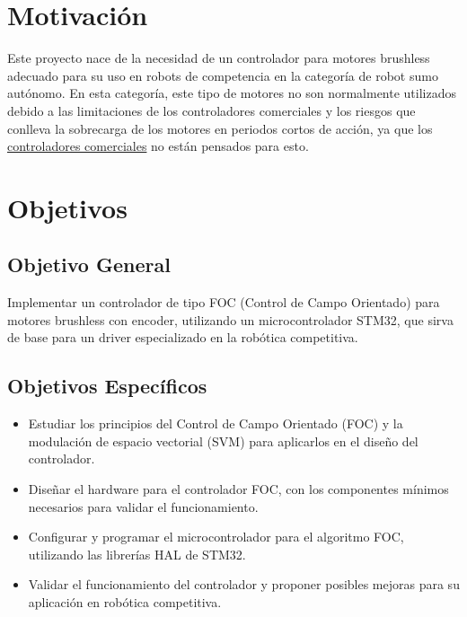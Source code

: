 \documentclass[11pt]{report}
\begin{document}
\newpage
\section{Motivación}
Este proyecto nace de la necesidad de un controlador para motores brushless adecuado para su uso en robots de competencia en la categoría de robot sumo autónomo. En esta categoría, este tipo de motores no son normalmente utilizados debido a las limitaciones de los controladores comerciales y los riesgos que conlleva la sobrecarga de los motores en periodos cortos de acción, ya que los \href{https://www.youtube.com/watch?v=SmDZmGU08BM}{controladores comerciales} no están pensados para esto.

\section{Objetivos}
\subsection{Objetivo General}
Implementar un controlador de tipo FOC (Control de Campo Orientado) para motores brushless con encoder, utilizando un microcontrolador STM32, que sirva de base para un driver especializado en la robótica competitiva.

\subsection{Objetivos Específicos}
\begin{itemize}
	\item Estudiar los principios del Control de Campo Orientado (FOC) y la modulación de espacio vectorial (SVM) para aplicarlos en el diseño del controlador.
	\item Diseñar el hardware para el controlador FOC, con los componentes mínimos necesarios para validar el funcionamiento.
	\item Configurar y programar el microcontrolador para el algoritmo FOC, utilizando las librerías HAL de STM32.
	\item Validar el funcionamiento del controlador y proponer posibles mejoras para su aplicación en robótica competitiva.
\end{itemize}

\newpage
\end{document}
